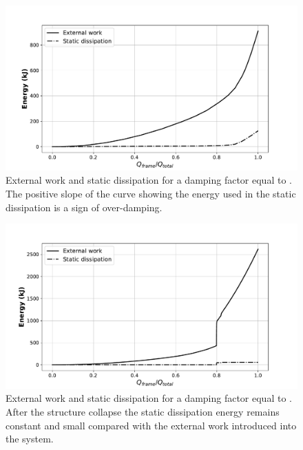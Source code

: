    \begin{figure}[!htpb]
      \centering
      \includegraphics[width=0.8 \textwidth]{../figures/result-model/energy_damp-5}
      \caption[External work and static dissipation for a damping factor equal to ]{External work and static dissipation for a damping factor equal to . The positive slope of the curve showing the energy used in the static dissipation is a sign of over-damping.}\label{fig:energy_damp-5}
    \end{figure}

    \begin{figure}[!htpb]
      \centering
      \includegraphics[width=0.8 \textwidth]{../figures/result-model/energy_damp-8}
      \caption[External work and static dissipation for a damping factor equal to ]{External work and static dissipation for a damping factor equal to . After the structure collapse the static dissipation energy remains constant and small compared with the external work introduced into the system.}\label{fig:energy_damp-8}
    \end{figure}

